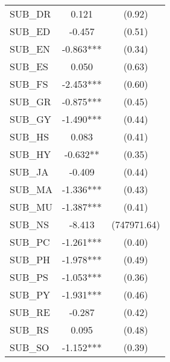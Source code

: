 \begin{table}[H]
\begin{threeparttable}
\begin{tabular}{l c c}
      SUB\_DR                               & 0.121                  & (0.92)               \\
      SUB\_ED                               & -0.457                 & (0.51)               \\
      SUB\_EN                               & -0.863***              & (0.34)               \\
      SUB\_ES                               & 0.050                  & (0.63)               \\
      SUB\_FS                               & -2.453***              & (0.60)               \\
      SUB\_GR                               & -0.875***              & (0.45)               \\
      SUB\_GY                               & -1.490***              & (0.44)               \\
      SUB\_HS                               & 0.083                  & (0.41)               \\
      SUB\_HY                               & -0.632**               & (0.35)               \\
      SUB\_JA                               & -0.409                 & (0.44)               \\
      SUB\_MA                               & -1.336***              & (0.43)               \\
      SUB\_MU                               & -1.387***              & (0.41)               \\
      SUB\_NS                               & -8.413                 & (747971.64)          \\
      SUB\_PC                               & -1.261***              & (0.40)               \\
      SUB\_PH                               & -1.978***              & (0.49)               \\
      SUB\_PS                               & -1.053***              & (0.36)               \\
      SUB\_PY                               & -1.931***              & (0.46)               \\
      SUB\_RE                               & -0.287                 & (0.42)               \\
      SUB\_RS                               & 0.095                  & (0.48)               \\
      SUB\_SO                               & -1.152***              & (0.39)               \\

\end{tabular}
\end{threeparttable}
\end{table}
